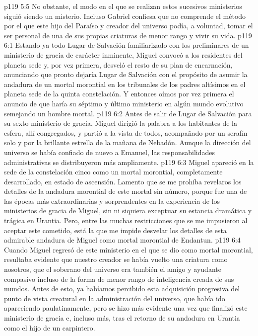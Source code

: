 \vs p119 5:5 No obstante, el modo en el que se realizan estos sucesivos ministerios siguió siendo un misterio. Incluso Gabriel confiesa que no comprende el método por el que este hijo del Paraíso y creador del universo podía, a voluntad, tomar el ser personal de una de sus propias criaturas de menor rango y vivir su vida.
\vs p119 6:1 Estando ya todo Lugar de Salvación familiarizado con los preliminares de un ministerio de gracia de carácter inminente, Miguel convocó a los residentes del planeta sede y, por vez primera, desveló el resto de su plan de encarnación, anunciando que pronto dejaría Lugar de Salvación con el propósito de asumir la andadura de un mortal morontial en los tribunales de los padres altísimos en el planeta sede de la quinta constelación. Y entonces oímos por vez primera el anuncio de que haría su séptimo y último ministerio en algún mundo evolutivo semejando un hombre mortal.
\vs p119 6:2 Antes de salir de Lugar de Salvación para su sexto ministerio de gracia, Miguel dirigió la palabra a los habitantes de la esfera, allí congregados, y partió a la vista de todos, acompañado por un serafín solo y por la brillante estrella de la mañana de Nebadón. Aunque la dirección del universo se había confiado de nuevo a Emanuel, las responsabilidades administrativas se distribuyeron más ampliamente.
\vs p119 6:3 Miguel apareció en la sede de la constelación cinco como un mortal morontial, completamente desarrollado, en estado de ascensión. Lamento que se me prohíba revelaros los detalles de la andadura morontial de este mortal sin número, porque fue una de las épocas más extraordinarias y sorprendentes en la experiencia de los ministerios de gracia de Miguel, sin ni siquiera exceptuar su estancia dramática y trágica en Urantia. Pero, entre las muchas restricciones que se me impusieron al aceptar este cometido, está la que me impide desvelar los detalles de esta admirable andadura de Miguel como mortal morontial de Endantun.
\vs p119 6:4 Cuando Miguel regresó de este ministerio en el que se dio como mortal morontial, resultaba evidente que nuestro creador se había vuelto una criatura como nosotros, que el soberano del universo era también el amigo y ayudante compasivo incluso de la forma de menor rango de inteligencia creada de sus mundos. Antes de esto, ya habíamos percibido esta adquisición progresiva del punto de vista creatural en la administración del universo, que había ido apareciendo paulatinamente, pero se hizo más evidente una vez que finalizó este ministerio de gracia e, incluso más, tras el retorno de su andadura en Urantia como el hijo de un carpintero.
